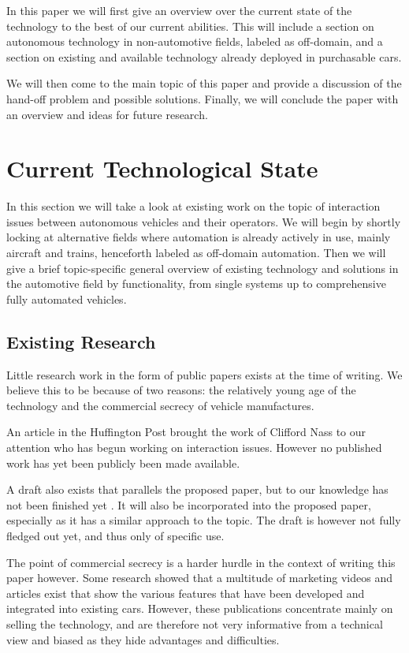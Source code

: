 \documentclass{acm_proc_article-sp}
\begin{document}
In this paper we will first give an overview over the current state of the technology to the best of our current abilities.
This will include a section on autonomous technology in non-automotive fields, labeled as off-domain, and a section on existing and available technology already deployed in purchasable cars.

We will then come to the main topic of this paper and provide a discussion of the hand-off problem and possible solutions.
Finally, we will conclude the paper with an overview and ideas for future research.

\section{Current Technological State}

In this section we will take a look at existing work on the topic of interaction issues between autonomous vehicles and their operators.
We will begin by shortly locking at alternative fields where automation is already actively in use, mainly aircraft and trains, henceforth labeled as off-domain automation.
Then we will give a brief topic-specific general overview of existing technology and solutions in the automotive field by functionality, from single systems up to comprehensive fully automated vehicles.

\subsection{Existing Research}

Little research work in the form of public papers exists at the time of writing.
We believe this to be because of two reasons: the relatively young age of the technology and the commercial secrecy of vehicle manufactures.

An article in the Huffington Post \cite{www:huffington_post} brought the work of Clifford Nass to our attention who has begun working on interaction issues.
However no published work has yet been publicly been made available.

A draft also exists that parallels the proposed paper, but to our knowledge has not been finished yet \cite{cummings:authority}.
It will also be incorporated into the proposed paper, especially as it has a similar approach to the topic.
The draft is however not fully fledged out yet, and thus only of specific use.

The point of commercial secrecy is a harder hurdle in the context of writing this paper however.
Some research showed that a multitude of marketing videos and articles exist that show the various features that have been developed and integrated into existing cars.
However, these publications concentrate mainly on selling the technology, and are therefore not very informative from a technical view and biased as they hide advantages and difficulties.
\end{document}

